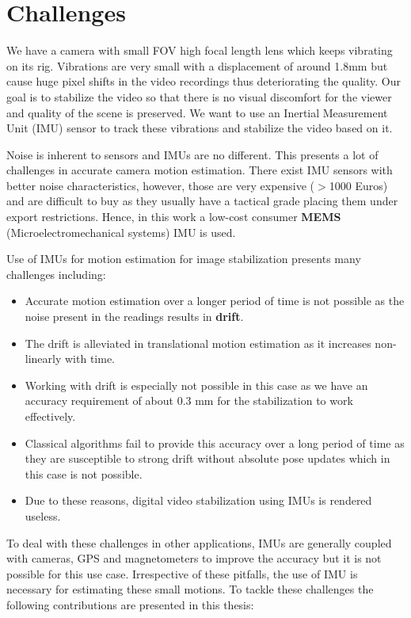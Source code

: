\section{Challenges}
We have a camera with small FOV high focal length lens which keeps vibrating on its rig. Vibrations are very small with a displacement of around 1.8mm but cause huge pixel shifts in the video recordings thus deteriorating the quality. Our goal is to stabilize the video so that there is no visual discomfort for the viewer and quality of the scene is preserved. We want to use an Inertial Measurement Unit (IMU) sensor to track these vibrations and stabilize the video based on it.

Noise is inherent to sensors and IMUs are no different. This presents a lot of challenges in accurate camera motion estimation. There exist IMU sensors with better noise characteristics, however, those are very expensive ($ > $1000 Euros) and are difficult to buy as they usually have a tactical grade placing them under export restrictions. Hence, in this work a low-cost consumer \textbf{MEMS} (Microelectromechanical systems) IMU is used. 

Use of IMUs for motion estimation for image stabilization presents many challenges including:

\begin{itemize}
    \item Accurate motion estimation over a longer period of time is not possible as the noise present in the readings results in \textbf{drift}.
    
    \item The drift is alleviated in translational motion estimation as it increases non-linearly with time.
    
    \item Working with drift is especially not possible in this case as we have an accuracy requirement of about 0.3 mm for the stabilization to work effectively.

    \item Classical algorithms fail to provide this accuracy over a long period of time as they are susceptible to strong drift without absolute pose updates which in this case is not possible.

    \item Due to these reasons, digital video stabilization using IMUs is rendered useless.
\end{itemize}
    
To deal with these challenges in other applications, IMUs are generally coupled with cameras, GPS and magnetometers to improve the accuracy but it is not possible for this use case. Irrespective of these pitfalls, the use of IMU is necessary for estimating these small motions. To tackle these challenges the following contributions are presented in this thesis:

